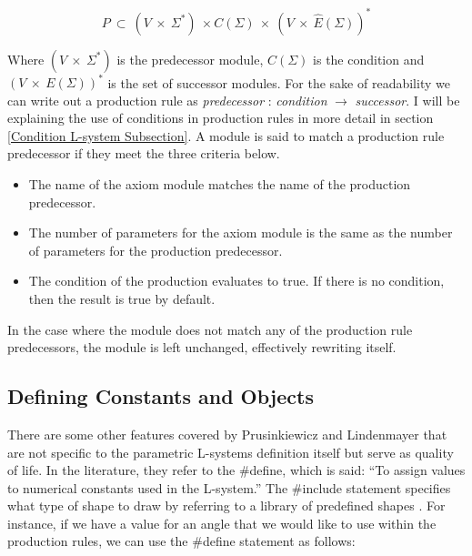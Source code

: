 \begin{equation}
P~ \subset~ (V~ \times~ \Sigma^*)~ \times C(\Sigma)~ \times~ (V~ \times~ \hat{E}(\Sigma))^*
\end{equation}

\noindent
Where $(V~ \times~ \Sigma^*) $ is the predecessor module, $C(\Sigma) $ is the condition and $(V~ \times~ E(\Sigma))^* $ is the set of successor modules. For the sake of readability we can write out a production rule as \textit{predecessor} : \textit{condition} $\rightarrow$ \textit{successor}. I will be explaining the use of conditions in production rules in more detail in section \ref{Condition L-system Subsection}.
A module is said to match a production rule predecessor if they meet the three criteria below.

\begin{itemize}
\item The name of the axiom module matches the name of the production predecessor.
\item The number of parameters for the axiom module is the same as the number of parameters for the production predecessor.
\item The condition of the production evaluates to true. If there is no condition, then the result is true by default.
\end{itemize}

\noindent
In the case where the module does not match any of the production rule predecessors, the module is left unchanged, effectively rewriting itself. 

\subsection{Defining Constants and Objects}

There are some other features covered by Prusinkiewicz and Lindenmayer that are not specific to the parametric L-systems definition itself but serve as quality of life. In the literature, they refer to the \#define, which is said: ``To assign values to numerical constants used in the L-system.'' The \#include statement specifies what type of shape to draw by referring to a library of predefined shapes \cite{prusinkiewicz2012algorithmic}.
\noindent
For instance, if we have a value for an angle that we would like to use within the production rules, we can use the \#define statement as follows:

